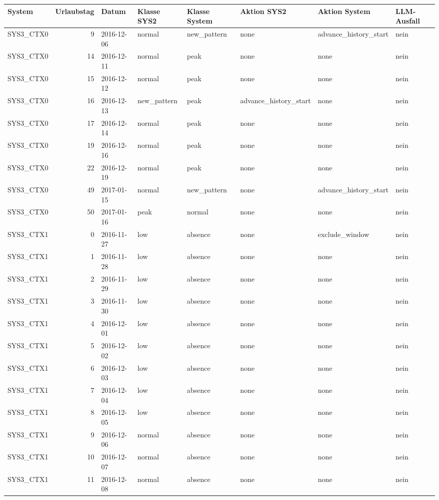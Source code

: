 \begin{tabular}{lrllllll}
\toprule
System & Urlaubstag & Datum & Klasse SYS2 & Klasse System & Aktion SYS2 & Aktion System & LLM-Ausfall \\
\midrule
SYS3\_CTX0 & 9 & 2016-12-06 & normal & new\_pattern & none & advance\_history\_start & nein \\
SYS3\_CTX0 & 14 & 2016-12-11 & normal & peak & none & none & nein \\
SYS3\_CTX0 & 15 & 2016-12-12 & normal & peak & none & none & nein \\
SYS3\_CTX0 & 16 & 2016-12-13 & new\_pattern & peak & advance\_history\_start & none & nein \\
SYS3\_CTX0 & 17 & 2016-12-14 & normal & peak & none & none & nein \\
SYS3\_CTX0 & 19 & 2016-12-16 & normal & peak & none & none & nein \\
SYS3\_CTX0 & 22 & 2016-12-19 & normal & peak & none & none & nein \\
SYS3\_CTX0 & 49 & 2017-01-15 & normal & new\_pattern & none & advance\_history\_start & nein \\
SYS3\_CTX0 & 50 & 2017-01-16 & peak & normal & none & none & nein \\
SYS3\_CTX1 & 0 & 2016-11-27 & low & absence & none & exclude\_window & nein \\
SYS3\_CTX1 & 1 & 2016-11-28 & low & absence & none & none & nein \\
SYS3\_CTX1 & 2 & 2016-11-29 & low & absence & none & none & nein \\
SYS3\_CTX1 & 3 & 2016-11-30 & low & absence & none & none & nein \\
SYS3\_CTX1 & 4 & 2016-12-01 & low & absence & none & none & nein \\
SYS3\_CTX1 & 5 & 2016-12-02 & low & absence & none & none & nein \\
SYS3\_CTX1 & 6 & 2016-12-03 & low & absence & none & none & nein \\
SYS3\_CTX1 & 7 & 2016-12-04 & low & absence & none & none & nein \\
SYS3\_CTX1 & 8 & 2016-12-05 & low & absence & none & none & nein \\
SYS3\_CTX1 & 9 & 2016-12-06 & normal & absence & none & none & nein \\
SYS3\_CTX1 & 10 & 2016-12-07 & normal & absence & none & none & nein \\
SYS3\_CTX1 & 11 & 2016-12-08 & normal & absence & none & none & nein \\

\end{tabular}
